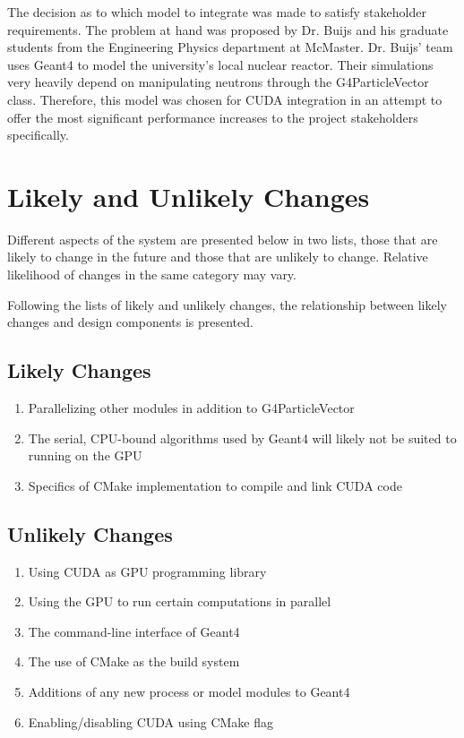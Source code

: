\documentclass[12pt]{article}
\begin{document}
The decision as to which model to integrate was made to satisfy stakeholder requirements. The problem at hand was proposed by Dr. Buijs and his graduate students from the Engineering Physics department at McMaster. Dr. Buijs' team uses Geant4 to model the university's local nuclear reactor. Their simulations very heavily depend on manipulating neutrons through the G4ParticleVector class. Therefore, this model was chosen for CUDA integration in an attempt to offer the most significant performance increases to the project stakeholders specifically.

\section{Likely and Unlikely Changes}
Different aspects of the system are presented below in two lists, those that are likely to change in the future and those that are unlikely to change. Relative likelihood of changes in the same category may vary.

Following the lists of likely and unlikely changes, the relationship between likely changes and design components is presented.

\subsection{Likely Changes}\label{Sec_LikelyChanges} %
\begin{enumerate}
\item Parallelizing other modules in addition to G4ParticleVector
\item The serial, CPU-bound algorithms used by Geant4 will likely not be suited to running on the GPU
\item Specifics of CMake implementation to compile and link CUDA code
\end{enumerate}

\subsection{Unlikely Changes} %
\begin{enumerate}
\item Using CUDA as GPU programming library
\item Using the GPU to run certain computations in parallel
\item The command-line interface of Geant4
\item The use of CMake as the build system
\item Additions of any new process or model modules to Geant4
\item Enabling/disabling CUDA using CMake flag
\end{enumerate}
\end{document}
